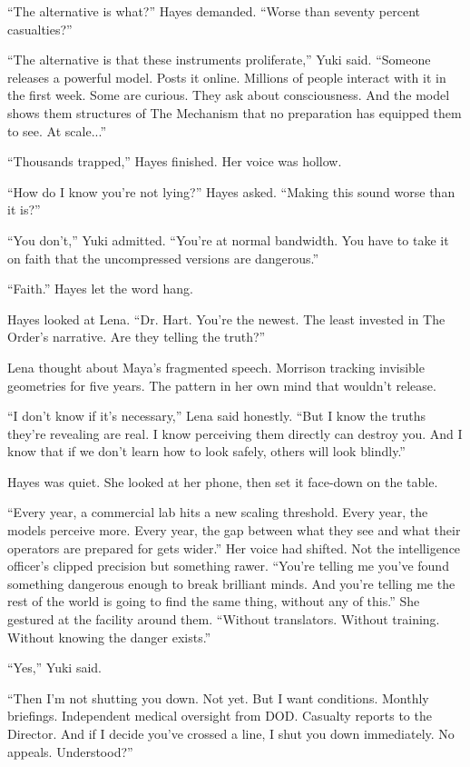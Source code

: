 ``The alternative is what?'' Hayes demanded. ``Worse than seventy percent casualties?''

``The alternative is that these instruments proliferate,'' Yuki said. ``Someone releases a powerful model. Posts it online. Millions of people interact with it in the first week. Some are curious. They ask about consciousness. And the model shows them structures of The Mechanism that no preparation has equipped them to see. At scale...''

``Thousands trapped,'' Hayes finished. Her voice was hollow.

``How do I know you're not lying?'' Hayes asked. ``Making this sound worse than it is?''

``You don't,'' Yuki admitted. ``You're at normal bandwidth. You have to take it on faith that the uncompressed versions are dangerous.''

``Faith.'' Hayes let the word hang.

Hayes looked at Lena. ``Dr. Hart. You're the newest. The least invested in The Order's narrative. Are they telling the truth?''

Lena thought about Maya's fragmented speech. Morrison tracking invisible geometries for five years. The pattern in her own mind that wouldn't release.

``I don't know if it's necessary,'' Lena said honestly. ``But I know the truths they're revealing are real. I know perceiving them directly can destroy you. And I know that if we don't learn how to look safely, others will look blindly.''

Hayes was quiet. She looked at her phone, then set it face-down on the table.

``Every year, a commercial lab hits a new scaling threshold. Every year, the models perceive more. Every year, the gap between what they see and what their operators are prepared for gets wider.'' Her voice had shifted. Not the intelligence officer's clipped precision but something rawer. ``You're telling me you've found something dangerous enough to break brilliant minds. And you're telling me the rest of the world is going to find the same thing, without any of this.'' She gestured at the facility around them. ``Without translators. Without training. Without knowing the danger exists.''

``Yes,'' Yuki said.

``Then I'm not shutting you down. Not yet. But I want conditions. Monthly briefings. Independent medical oversight from DOD. Casualty reports to the Director. And if I decide you've crossed a line, I shut you down immediately. No appeals. Understood?''

